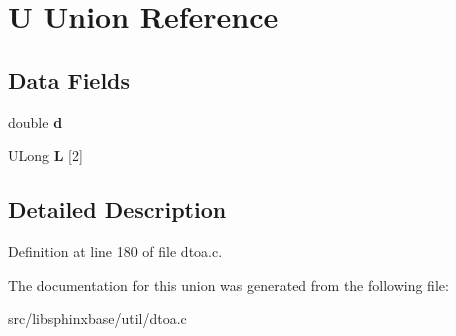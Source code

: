 \section{U Union Reference}
\label{unionU}
\subsection*{Data Fields}
\begin{DoxyCompactItemize}
\item 
double {\bfseries d}\label{unionU_a6379e5194213c802bb8c6786eca8ad50}

\item 
U\-Long {\bfseries L} [2]\label{unionU_aa72022b00fe1608edcdbc0a12e525164}

\end{DoxyCompactItemize}


\subsection{Detailed Description}


Definition at line 180 of file dtoa.\-c.



The documentation for this union was generated from the following file\-:\begin{DoxyCompactItemize}
\item 
src/libsphinxbase/util/dtoa.\-c\end{DoxyCompactItemize}
